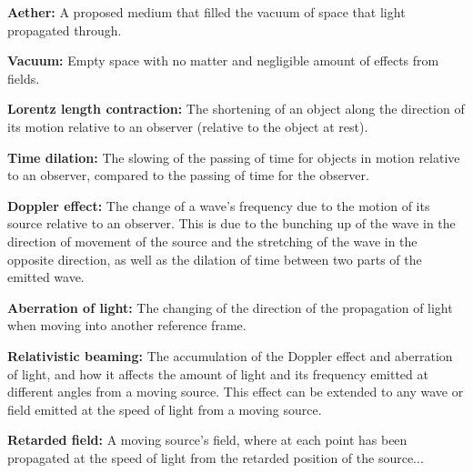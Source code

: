 \linesep

\noindent \hypertarget{def-aether}{\textbf{Aether:}}
A proposed medium that filled the vacuum of space that light propagated through.

\linesep

\noindent \hypertarget{def-vacuum}{\textbf{Vacuum:}}
Empty space with no matter and negligible amount of effects from fields.

\linesep

\noindent \hypertarget{def-length-contraction}{\textbf{Lorentz length contraction:}}
The shortening of an object along the direction of its motion relative to an observer (relative to the object at rest).

\linesep

\noindent \hypertarget{def-time-dilation}{\textbf{Time dilation:}}
The slowing of the passing of time for objects in motion relative to an observer, compared to the passing of time for the observer.

\linesep

\noindent \hypertarget{def-doppler-effect}{\textbf{Doppler effect:}}
The change of a wave's frequency due to the motion of its source relative to an observer. This is due to the bunching up of the wave in the direction of movement of the source and the stretching of the wave in the opposite direction, as well as the dilation of time between two parts of the emitted wave.

\linesep

\noindent \hypertarget{def-aberration}{\textbf{Aberration of light:}}
The changing of the direction of the propagation of light when moving into another reference frame.

\linesep

\noindent \hypertarget{def-relativistic-beaming}{\textbf{Relativistic beaming:}}
The accumulation of the Doppler effect and aberration of light, and how it affects the amount of light and its frequency emitted at different angles from a moving source. This effect can be extended to any wave or field emitted at the speed of light from a moving source.

\linesep

\noindent \hypertarget{def-retarded-field}{\textbf{Retarded field:}}
A moving source's field, where at each point has been propagated at the speed of light from the retarded position of the source...

